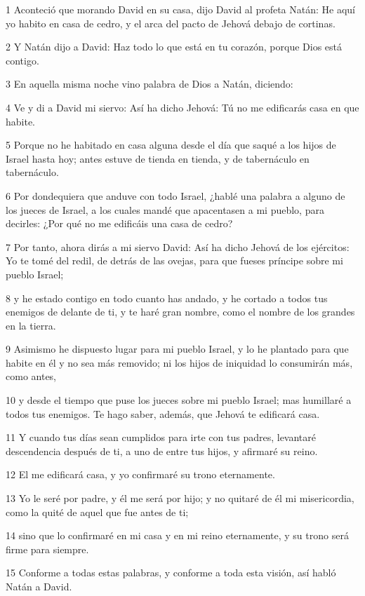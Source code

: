 \par 1 Aconteció que morando David en su casa, dijo David al profeta Natán: He aquí yo habito en casa de cedro, y el arca del pacto de Jehová debajo de cortinas.
\par 2 Y Natán dijo a David: Haz todo lo que está en tu corazón, porque Dios está contigo.
\par 3 En aquella misma noche vino palabra de Dios a Natán, diciendo:
\par 4 Ve y di a David mi siervo: Así ha dicho Jehová: Tú no me edificarás casa en que habite.
\par 5 Porque no he habitado en casa alguna desde el día que saqué a los hijos de Israel hasta hoy; antes estuve de tienda en tienda, y de tabernáculo en tabernáculo.
\par 6 Por dondequiera que anduve con todo Israel, ¿hablé una palabra a alguno de los jueces de Israel, a los cuales mandé que apacentasen a mi pueblo, para decirles: ¿Por qué no me edificáis una casa de cedro?
\par 7 Por tanto, ahora dirás a mi siervo David: Así ha dicho Jehová de los ejércitos: Yo te tomé del redil, de detrás de las ovejas, para que fueses príncipe sobre mi pueblo Israel;
\par 8 y he estado contigo en todo cuanto has andado, y he cortado a todos tus enemigos de delante de ti, y te haré gran nombre, como el nombre de los grandes en la tierra.
\par 9 Asimismo he dispuesto lugar para mi pueblo Israel, y lo he plantado para que habite en él y no sea más removido; ni los hijos de iniquidad lo consumirán más, como antes,
\par 10 y desde el tiempo que puse los jueces sobre mi pueblo Israel; mas humillaré a todos tus enemigos. Te hago saber, además, que Jehová te edificará casa.
\par 11 Y cuando tus días sean cumplidos para irte con tus padres, levantaré descendencia después de ti, a uno de entre tus hijos, y afirmaré su reino.
\par 12 El me edificará casa, y yo confirmaré su trono eternamente.
\par 13 Yo le seré por padre, y él me será por hijo; y no quitaré de él mi misericordia, como la quité de aquel que fue antes de ti;
\par 14 sino que lo confirmaré en mi casa y en mi reino eternamente, y su trono será firme para siempre.
\par 15 Conforme a todas estas palabras, y conforme a toda esta visión, así habló Natán a David.
